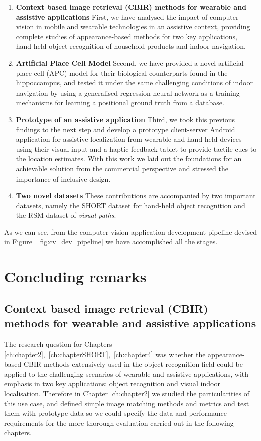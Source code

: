 \begin{enumerate}
\item \textbf{Context based image retrieval (CBIR) methods for wearable and assistive applications} First, we have analysed the impact of computer vision in mobile and wearable technologies in an assistive context, providing complete studies of appearance-based methods for two key applications, hand-held object recognition of household products and indoor navigation.

\item \textbf{Artificial Place Cell Model} Second, we have provided a novel artificial place cell (APC) model for their biological counterparts found in the hippoccampus, and tested it under the same challenging conditions of indoor navigation by using a generalised regression neural network as a training mechanisms for learning a positional ground truth from a database.

\item \textbf{Prototype of an assistive application} Third, we took this previous findings to the next step and develop a prototype client-server Android application for assistive localization from wearable and hand-held devices using their visual input and a haptic feedback tablet to provide tactile cues to the location estimates. With this work we laid out the foundations for an achievable solution from the commercial perspective and stressed the importance of inclusive design.


\item \textbf{Two novel datasets} These contributions are accompanied by two important datasets, namely the SHORT dataset for hand-held object recognition and the RSM dataset of \emph{visual paths}.
\end{enumerate}

As we can see, from the computer vision application development pipeline devised in Figure ~\ref{fig:cv_dev_pipeline} we have accomplished all the stages.

\section{Concluding remarks}

\subsection{Context based image retrieval (CBIR) methods for wearable and assistive applications}

The research question for Chapters \ref{ch:chapter2},~\ref{ch:chapterSHORT},~\ref{ch:chapter4} was whether the appearance-based CBIR methods extensively used in the object recognition field could be applied to the challenging scenarios of wearable and assistive applications, with emphasis in two key applications: object recognition and visual indoor localisation. Therefore in Chapter \ref{ch:chapter2} we studied the particularities of this use case, and defined simple image matching methods and metrics and test them with prototype data so we could specify the data and performance requirements for the more thorough evaluation carried out in the following chapters.

